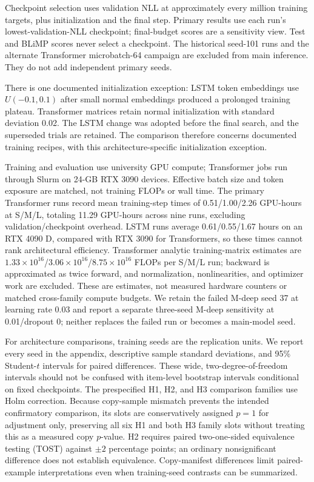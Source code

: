 \documentclass[10pt]{article}
\begin{document}
Checkpoint selection uses validation NLL at approximately every million training targets, plus initialization and the final step. Primary results use each run's lowest-validation-NLL checkpoint; final-budget scores are a sensitivity view. Test and BLiMP scores never select a checkpoint. The historical seed-101 runs and the alternate Transformer microbatch-64 campaign are excluded from main inference. They do not add independent primary seeds.

There is one documented initialization exception: LSTM token embeddings use $U(-0.1,0.1)$ after small normal embeddings produced a prolonged training plateau. Transformer matrices retain normal initialization with standard deviation 0.02. The LSTM change was adopted before the final search, and the superseded trials are retained. The comparison therefore concerns documented training recipes, with this architecture-specific initialization exception.

Training and evaluation use university GPU compute; Transformer jobs run through Slurm on 24-GB RTX 3090 devices. Effective batch size and token exposure are matched, not training FLOPs or wall time. The primary Transformer runs record mean training-step times of 0.51/1.00/2.26 GPU-hours at S/M/L, totaling 11.29 GPU-hours across nine runs, excluding validation/checkpoint overhead. LSTM runs average 0.61/0.55/1.67 hours on an RTX 4090 D, compared with RTX 3090 for Transformers, so these times cannot rank architectural efficiency. Transformer analytic training-matrix estimates are $1.33\times10^{16}$/$3.06\times10^{16}$/$8.75\times10^{16}$ FLOPs per S/M/L run; backward is approximated as twice forward, and normalization, nonlinearities, and optimizer work are excluded. These are estimates, not measured hardware counters or matched cross-family compute budgets. We retain the failed M-deep seed 37 at learning rate 0.03 and report a separate three-seed M-deep sensitivity at 0.01/dropout 0; neither replaces the failed run or becomes a main-model seed.

For architecture comparisons, training seeds are the replication units. We report every seed in the appendix, descriptive sample standard deviations, and 95\% Student-$t$ intervals for paired differences. These wide, two-degree-of-freedom intervals should not be confused with item-level bootstrap intervals conditional on fixed checkpoints. The prespecified H1, H2, and H3 comparison families use Holm correction. Because copy-sample mismatch prevents the intended confirmatory comparison, its slots are conservatively assigned $p=1$ for adjustment only, preserving all six H1 and both H3 family slots without treating this as a measured copy $p$-value. H2 requires paired two-one-sided equivalence testing (TOST) against $\pm2$ percentage points; an ordinary nonsignificant difference does not establish equivalence. Copy-manifest differences limit paired-example interpretations even when training-seed contrasts can be summarized.
\end{document}
